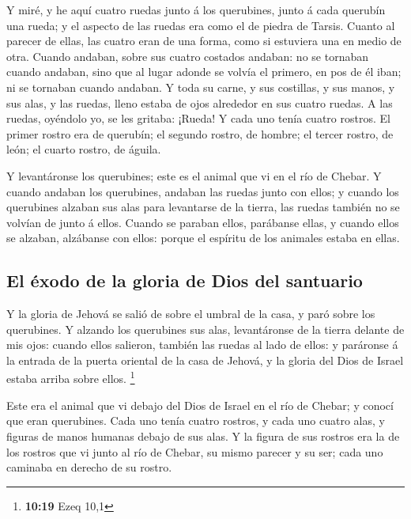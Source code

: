  Y miré, y he aquí cuatro ruedas junto á los querubines,
junto á cada querubín una rueda; y el aspecto de las ruedas era como el
de piedra de Tarsis.  Cuanto al parecer de ellas, las
cuatro eran de una forma, como si estuviera una en medio de otra.
 Cuando andaban, sobre sus cuatro costados andaban: no se
tornaban cuando andaban, sino que al lugar adonde se volvía el primero,
en pos de él iban; ni se tornaban cuando andaban.  Y toda
su carne, y sus costillas, y sus manos, y sus alas, y las ruedas, lleno
estaba de ojos alrededor en sus cuatro ruedas.  A las
ruedas, oyéndolo yo, se les gritaba: ¡Rueda!  Y cada uno
tenía cuatro rostros. El primer rostro era de querubín; el segundo
rostro, de hombre; el tercer rostro, de león; el cuarto rostro, de
águila.

 Y levantáronse los querubines; este es el animal que vi en
el río de Chebar.  Y cuando andaban los querubines, andaban
las ruedas junto con ellos; y cuando los querubines alzaban sus alas
para levantarse de la tierra, las ruedas también no se volvían de junto
á ellos.  Cuando se paraban ellos, parábanse ellas, y
cuando ellos se alzaban, alzábanse con ellos: porque el espíritu de los
animales estaba en ellas.

\hypertarget{el-uxe9xodo-de-la-gloria-de-dios-del-santuario}{%
\subsection{El éxodo de la gloria de Dios del
santuario}\label{el-uxe9xodo-de-la-gloria-de-dios-del-santuario}}

 Y la gloria de Jehová se salió de sobre el umbral de la
casa, y paró sobre los querubines.  Y alzando los
querubines sus alas, levantáronse de la tierra delante de mis ojos:
cuando ellos salieron, también las ruedas al lado de ellos: y paráronse
á la entrada de la puerta oriental de la casa de Jehová, y la gloria del
Dios de Israel estaba arriba sobre ellos. \footnote{\textbf{10:19} Ezeq
  10,1}

 Este era el animal que vi debajo del Dios de Israel en el
río de Chebar; y conocí que eran querubines.  Cada uno
tenía cuatro rostros, y cada uno cuatro alas, y figuras de manos humanas
debajo de sus alas.  Y la figura de sus rostros era la de
los rostros que vi junto al río de Chebar, su mismo parecer y su ser;
cada uno caminaba en derecho de su rostro.

